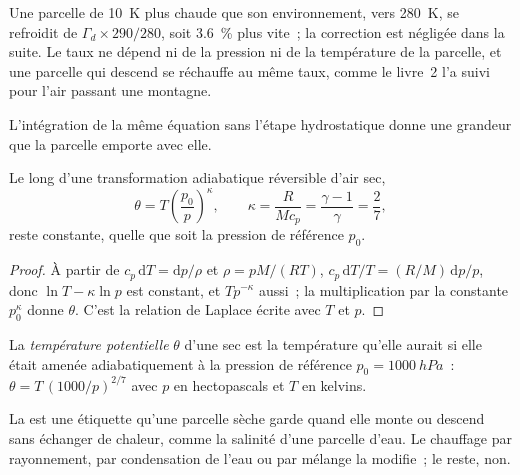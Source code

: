 Une parcelle de \qty{10}{K} plus chaude que son environnement, vers \qty{280}{K}, se refroidit de
$\Gamma_d \times 290/280$, soit \qty{3.6}{\percent} plus vite~; la correction est
négligée dans la suite. Le taux ne dépend ni de la pression ni de la
température de la parcelle, et une parcelle qui descend se réchauffe au même taux, comme
le livre~2 l'a suivi pour l'air passant une montagne.

L'intégration de la même équation sans l'étape hydrostatique donne une grandeur que
la parcelle emporte avec elle.

\begin{proposition}\label{prop:b1:fluid-envelopes-structure:theta}
Le long d'une transformation adiabatique réversible d'air sec,
\[
  \theta = T\left(\frac{p_0}{p}\right)^{\kappa},\qquad \kappa = \frac{R}{Mc_p} =
  \frac{\gamma - 1}{\gamma} = \frac{2}{7},
\]
reste constante, quelle que soit la pression de référence $p_0$.
\end{proposition}

\begin{proof}
À partir de $c_p\,\mathrm dT = \mathrm dp/\rho$ et $\rho = pM/(RT)$, $c_p\,\mathrm dT/T
= (R/M)\,\mathrm dp/p$, donc $\ln T - \kappa \ln p$ est constant, et $T
p^{-\kappa}$ aussi~; la multiplication par la constante $p_0^{\kappa}$ donne $\theta$. C'est
la relation de Laplace écrite avec $T$ et $p$.
\end{proof}

\begin{definition}\label{def:b1:fluid-envelopes-structure:potential-temperature}
La \emph{température potentielle} $\theta$ d'une
 sec est la température qu'elle aurait si elle était amenée adiabatiquement à
la pression de référence $p_0 = \qty{1000}{hPa}$~: $\theta = T\,(1000/p)^{2/7}$ avec
$p$ en hectopascals et $T$ en kelvins.
\end{definition}

La  est une étiquette qu'une parcelle sèche garde quand elle monte ou
descend sans échanger de chaleur, comme la salinité d'une parcelle d'eau. Le chauffage par
rayonnement, par condensation de l'eau ou par mélange la modifie~; le reste, non.

